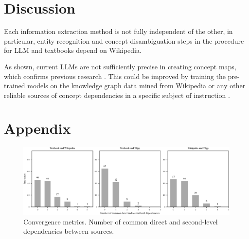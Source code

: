 \documentclass{article}
\begin{document}
\section{Discussion}




Each information extraction method is not fully independent of the other, in particular, entity recognition and concept disambiguation steps in the procedure for LLM and textbooks depend on Wikipedia.





As shown, current LLMs are not sufficiently precise in creating concept maps, which confirms previous research \cite{hwang2021comet}. This could be improved by training the pre-trained models on the knowledge graph data mined from Wikipedia or any other reliable sources of concept dependencies in a specific subject of instruction \cite{west2022symbolic}.





\newpage


\section{Appendix}



\begin{figure}[H]
    \centering
    \includegraphics[width=.95\textwidth]{img/comp_second_deps.pdf}
    \caption{Convergence metrics. Number of common direct and second-level dependencies between sources.}
    \label{fig:comp_second_deps}
\end{figure}
\end{document}
